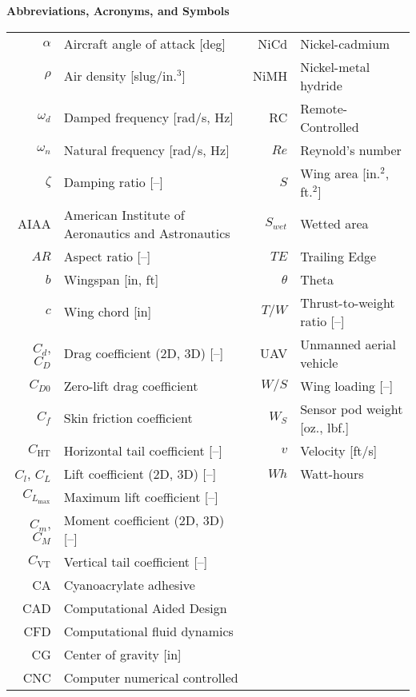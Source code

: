%
\textbf{Abbreviations, Acronyms, and Symbols}

\begin{tabular}{rl!{\hspace{1em}}rl}
    $\alpha$ & Aircraft angle of attack [deg] & NiCd & Nickel-cadmium\\
    $\rho$ & Air density [slug/in.$^3$] & NiMH & Nickel-metal hydride\\
    $\omega_d$ & Damped frequency [rad/s, Hz] & RC & Remote-Controlled\\
    $\omega_n$ & Natural frequency [rad/s, Hz] &$Re$ & Reynold's number\\
    $\zeta$ & Damping ratio [--] &$S $ & Wing area [in.$^2$, ft.$^2$]\\
    AIAA & American Institute of Aeronautics and Astronautics &$S_{wet}$ & Wetted area\\
    $AR$ & Aspect ratio [--] & $TE$ & Trailing Edge\\
    $b$ & Wingspan [in, ft] & $\theta$ & Theta\\
    $c$ & Wing chord [in] &$T/W$ & Thrust-to-weight ratio [--]\\
    $C_d$, $C_D$ & Drag coefficient (2D, 3D) [--] &UAV & Unmanned aerial vehicle\\
    $C_{D0}$ & Zero-lift drag coefficient & $W/S$ & Wing loading [--]\\
    $C_f$ & Skin friction coefficient &$W_S$ & Sensor pod weight [oz., lbf.]\\
    $C_\text{HT}$ & Horizontal tail coefficient [--] & $v$ & Velocity [ft/s]\\
    $C_l$, $C_L$ & Lift coefficient (2D, 3D) [--] & $Wh$ & Watt-hours\\
    $C_{L_\text{max}}$ & Maximum lift coefficient [--]\\
    $C_m$, $C_M$ & Moment coefficient (2D, 3D) [--]\\
    $C_\text{VT}$ & Vertical tail coefficient [--]\\
    CA & Cyanoacrylate adhesive\\
    CAD & Computational Aided Design\\
    CFD & Computational fluid dynamics\\
    CG & Center of gravity [in]\\
    CNC & Computer numerical controlled\\

\end{tabular}
